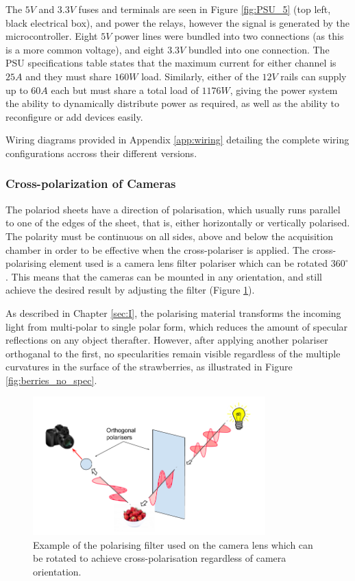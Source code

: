 \documentclass[fleqn,twoside]{article}
\begin{document}
The $5V$ and $3.3V$ fuses and terminals are seen in Figure \ref{fig:PSU_5} (top left, black electrical box), and power the relays, however the signal is generated by the microcontroller. Eight $5V$ power lines were bundled into two connections (as this is a more common voltage), and eight $3.3V$ bundled into one connection. The PSU specifications table states that the maximum current for either channel is $25A$ and they must share $160W$ load. Similarly, either of the $12V$ rails can supply up to $60A$ each but must share a total load of $1176W$, giving the power system the ability to dynamically distribute power as required, as well as the ability to reconfigure or add devices easily.

Wiring diagrams provided in Appendix \ref{app:wiring} detailing the complete wiring configurations accross their different versions.



\subsubsection{Cross-polarization of Cameras}


The polariod sheets have a direction of polarisation, which usually runs parallel to one of the edges of the sheet, that is, either horizontally or vertically polarised. The polarity must be continuous on all sides, above and below the acquisition chamber in order to be effective when the cross-polariser is applied. The cross-polarising element used is a camera lens filter polariser which can be rotated $360^{\circ}$. This means that the cameras can be mounted in any orientation, and still achieve the desired result by adjusting the filter (Figure \ref{fig:nd_filters}).


As described in Chapter \ref{sec:I}, the polarising material transforms the incoming light from multi-polar to single polar form, which reduces the amount of specular reflections on any object therafter. However, after applying another polariser orthoganal to the first, no specularities remain visible regardless of the multiple curvatures in the surface of the strawberries, as illustrated in Figure \ref{fig:berries_no_spec}. 

\begin{figure}[h]
	\centering
	\includegraphics[width=0.8\textwidth]{cross-polariser.png}
	\caption{Example of the polarising filter used on the camera lens which can be rotated to achieve cross-polarisation regardless of camera orientation.}
	\label{fig:nd_filters}
\end{figure}
\end{document}

